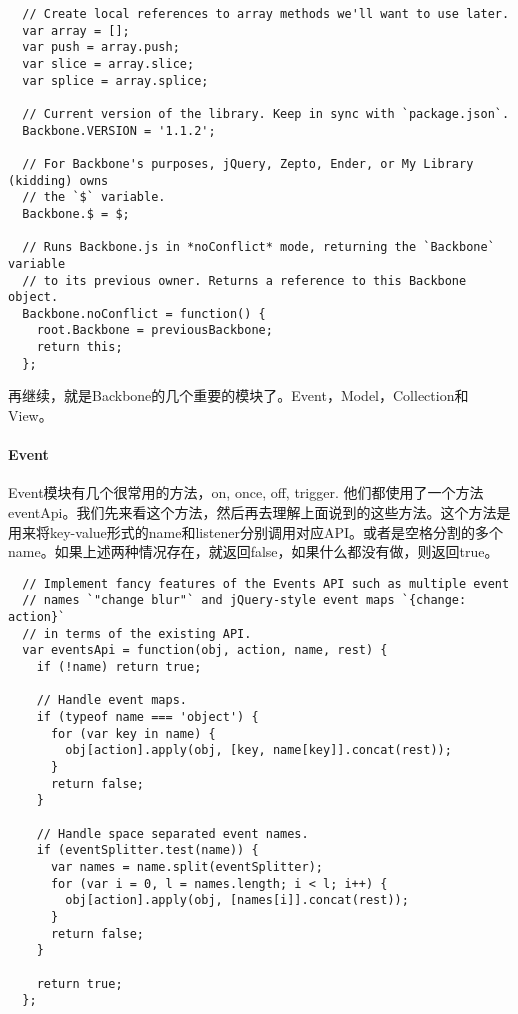 \documentclass[12pt, oneside, b5paper]{book}
\begin{document}
\begin{CJK}{UTF8}{gkai}
\begin{lstlisting}
  // Create local references to array methods we'll want to use later.
  var array = [];
  var push = array.push;
  var slice = array.slice;
  var splice = array.splice;

  // Current version of the library. Keep in sync with `package.json`.
  Backbone.VERSION = '1.1.2';

  // For Backbone's purposes, jQuery, Zepto, Ender, or My Library (kidding) owns
  // the `$` variable.
  Backbone.$ = $;

  // Runs Backbone.js in *noConflict* mode, returning the `Backbone` variable
  // to its previous owner. Returns a reference to this Backbone object.
  Backbone.noConflict = function() {
    root.Backbone = previousBackbone;
    return this;
  };
		\end{lstlisting}

		再继续，就是Backbone的几个重要的模块了。Event，Model，Collection和View。

		\paragraph{Event}
		Event模块有几个很常用的方法，on, once, off, trigger. 他们都使用了一个方法eventApi。我们先来看这个方法，然后再去理解上面说到的这些方法。这个方法是用来将key-value形式的name和listener分别调用对应API。或者是空格分割的多个name。如果上述两种情况存在，就返回false，如果什么都没有做，则返回true。

	\begin{lstlisting}
  // Implement fancy features of the Events API such as multiple event
  // names `"change blur"` and jQuery-style event maps `{change: action}`
  // in terms of the existing API.
  var eventsApi = function(obj, action, name, rest) {
    if (!name) return true;

    // Handle event maps.
    if (typeof name === 'object') {
      for (var key in name) {
        obj[action].apply(obj, [key, name[key]].concat(rest));
      }
      return false;
    }

    // Handle space separated event names.
    if (eventSplitter.test(name)) {
      var names = name.split(eventSplitter);
      for (var i = 0, l = names.length; i < l; i++) {
        obj[action].apply(obj, [names[i]].concat(rest));
      }
      return false;
    }

    return true;
  };
	\end{lstlisting}


\end{CJK}
\end{document}

